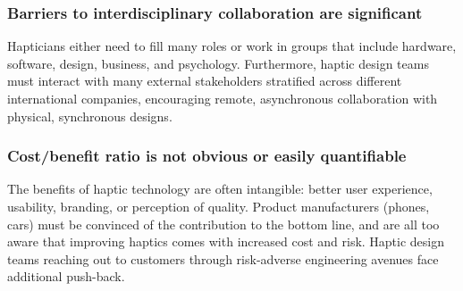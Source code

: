     \subsubsection{Barriers to interdisciplinary collaboration are significant}    
    \noindent
    Hapticians either need to fill many roles or work in groups that include hardware, software, design, business, and psychology.
    Furthermore, haptic design teams must interact with many external stakeholders stratified across different international companies, encouraging remote, asynchronous collaboration with physical, synchronous designs.
    
    
    \subsubsection{Cost/benefit ratio is not obvious or easily quantifiable}    
    \noindent
    The benefits of haptic technology are often intangible: better user experience, usability, branding, or perception of quality.
    Product manufacturers (phones, cars) must be convinced of the contribution to the bottom line, and %
    are all too aware that improving haptics comes with increased cost and risk.
    Haptic design teams reaching out to customers through risk-adverse engineering avenues face additional push-back. %
    
